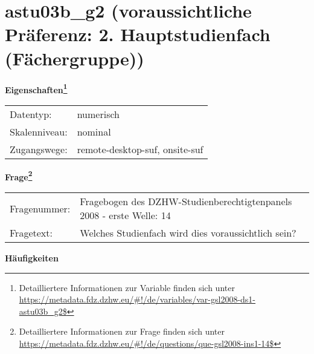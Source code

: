 
    \setcounter{footnote}{0}

    \vspace*{-1.8cm}
	\section{astu03b\_g2 (voraussichtliche Präferenz: 2. Hauptstudienfach (Fächergruppe))}
	\label{section:astu03b_g2}



    \vspace*{0.5cm}
    \noindent\textbf{Eigenschaften\footnote{Detailliertere Informationen zur Variable finden sich unter
		\url{https://metadata.fdz.dzhw.eu/\#!/de/variables/var-gsl2008-ds1-astu03b_g2$}}}\\
	\begin{tabularx}{\hsize}{@{}lX}
	Datentyp: & numerisch \\
	Skalenniveau: & nominal \\
	Zugangswege: &
	  remote-desktop-suf, 
	  onsite-suf
 \\
    \end{tabularx}



				\vspace*{0.5cm}
                \noindent\textbf{Frage\footnote{Detailliertere Informationen zur Frage finden sich unter
		              \url{https://metadata.fdz.dzhw.eu/\#!/de/questions/que-gsl2008-ins1-14$}}}\\
				\begin{tabularx}{\hsize}{@{}lX}
					Fragenummer: &
					  Fragebogen des DZHW-Studienberechtigtenpanels 2008 - erste Welle:
					  14
 \\
					Fragetext: & Welches Studienfach wird dies voraussichtlich sein? \\
				\end{tabularx}





        		\vspace*{0.5cm}
                \noindent\textbf{Häufigkeiten}

